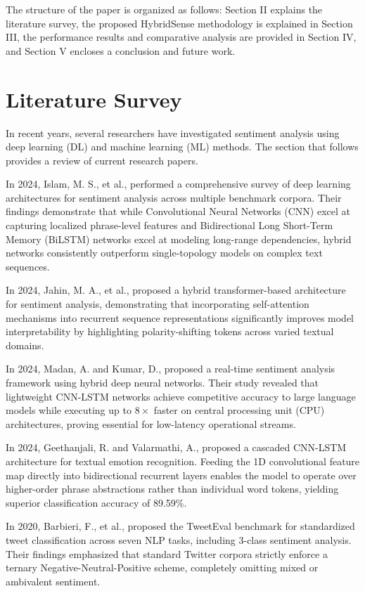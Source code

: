 \documentclass[conference]{IEEEtran}
\begin{document}
The structure of the paper is organized as follows: Section II explains the literature survey, the proposed HybridSense methodology is explained in Section III, the performance results and comparative analysis are provided in Section IV, and Section V encloses a conclusion and future work.

\section{Literature Survey}
In recent years, several researchers have investigated sentiment analysis using deep learning (DL) and machine learning (ML) methods. The section that follows provides a review of current research papers.

In 2024, Islam, M. S., et al., \cite{islam2024deep} performed a comprehensive survey of deep learning architectures for sentiment analysis across multiple benchmark corpora. Their findings demonstrate that while Convolutional Neural Networks (CNN) excel at capturing localized phrase-level features and Bidirectional Long Short-Term Memory (BiLSTM) networks excel at modeling long-range dependencies, hybrid networks consistently outperform single-topology models on complex text sequences.

In 2024, Jahin, M. A., et al., \cite{jahin2024hybrid} proposed a hybrid transformer-based architecture for sentiment analysis, demonstrating that incorporating self-attention mechanisms into recurrent sequence representations significantly improves model interpretability by highlighting polarity-shifting tokens across varied textual domains.

In 2024, Madan, A. and Kumar, D., \cite{madan2024real} proposed a real-time sentiment analysis framework using hybrid deep neural networks. Their study revealed that lightweight CNN-LSTM networks achieve competitive accuracy to large language models while executing up to $8\times$ faster on central processing unit (CPU) architectures, proving essential for low-latency operational streams.

In 2024, Geethanjali, R. and Valarmathi, A., \cite{geethanjali2024hybrid} proposed a cascaded CNN-LSTM architecture for textual emotion recognition. Feeding the 1D convolutional feature map directly into bidirectional recurrent layers enables the model to operate over higher-order phrase abstractions rather than individual word tokens, yielding superior classification accuracy of 89.59\%.

In 2020, Barbieri, F., et al., \cite{barbieri2020tweeteval} proposed the TweetEval benchmark for standardized tweet classification across seven NLP tasks, including 3-class sentiment analysis. Their findings emphasized that standard Twitter corpora strictly enforce a ternary Negative-Neutral-Positive scheme, completely omitting mixed or ambivalent sentiment.
\end{document}
